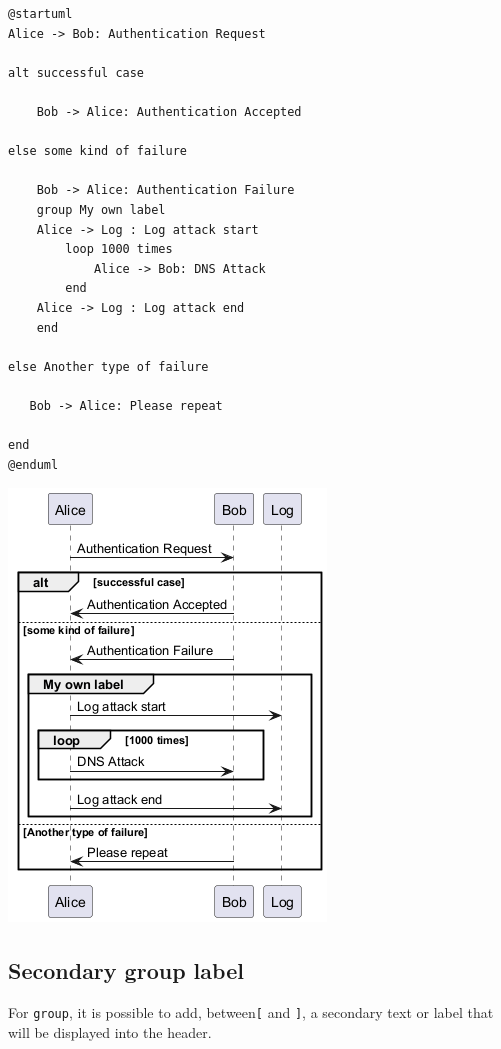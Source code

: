 \begin{verbatim}
@startuml
Alice -> Bob: Authentication Request

alt successful case

    Bob -> Alice: Authentication Accepted

else some kind of failure

    Bob -> Alice: Authentication Failure
    group My own label
    Alice -> Log : Log attack start
        loop 1000 times
            Alice -> Bob: DNS Attack
        end
    Alice -> Log : Log attack end
    end

else Another type of failure

   Bob -> Alice: Please repeat

end
@enduml
\end{verbatim}
\begin{center}
\includegraphics[scale=0.60]{imgw/img-4847318c167e0cda09263d390a6c3dd5.png}
\end{center}
%
%
\subsection{Secondary group label}


For \texttt{group}, it is possible to add, between\texttt{[} and \texttt{]}, a secondary text or label that will be displayed into the header.


